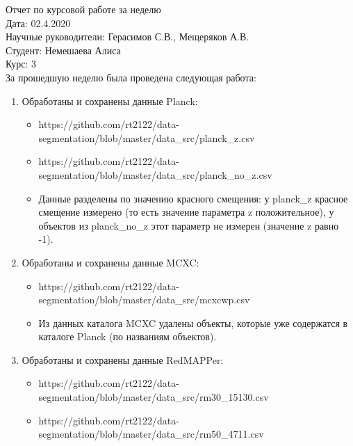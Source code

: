 \documentclass{article}
\begin{document}
Отчет по курсовой работе за неделю\\
Дата: 02.4.2020\\
Научные руководители: Герасимов С.В., Мещеряков А.В.\\
Студент: Немешаева Алиса\\
Курс: 3\\

За прошедшую неделю была проведена следующая работа:\\
\begin{enumerate}
    \item Обработаны и сохранены данные Planck: \\
        \begin{itemize}
            \item https://github.com/rt2122/data-segmentation/blob/master/data\_src/planck\_z.csv\\ 
            \item https://github.com/rt2122/data-segmentation/blob/master/data\_src/planck\_no\_z.csv\\
            \item Данные разделены по значению красного смещения: у planck\_z красное смещение измерено 
                (то есть значение параметра z положительное), у объектов из planck\_no\_z этот параметр не
                измерен (значение z равно -1).\\
        \end{itemize}
    \item Обработаны и сохранены данные MCXC: \\
        \begin{itemize}
            \item https://github.com/rt2122/data-segmentation/blob/master/data\_src/mcxcwp.csv \\
            \item Из данных каталога MCXC удалены объекты, которые уже содержатся в каталоге 
                Planck (по названиям объектов).\\
        \end{itemize}
    \item Обработаны и сохранены данные RedMAPPer: \\
        \begin{itemize}
            \item https://github.com/rt2122/data-segmentation/blob/master/data\_src/rm30\_15130.csv \\
            \item https://github.com/rt2122/data-segmentation/blob/master/data\_src/rm50\_4711.csv \\

\end{itemize}
\end{enumerate}
\end{document}
